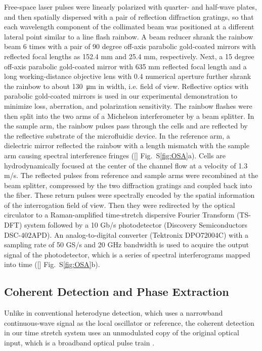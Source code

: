 \documentclass[aps,pra,reprint,longbibliography,superscriptaddress]{revtex4-1}
\begin{document}
Free-space laser pulses were linearly polarized with quarter- and half-wave plates, and then spatially dispersed with a pair of reflection diffraction gratings, so that each wavelength component of the collimated beam was positioned at a different lateral point similar to a line flash rainbow. A beam reducer shrank the rainbow beam 6 times with a pair of 90 degree off-axis parabolic gold-coated mirrors with reflected focal lengths as 152.4 mm and 25.4 mm, respectively. Next, a 15 degree off-axis parabolic gold-coated mirror with 635 mm reflected focal length and a long working-distance objective lens with 0.4 numerical aperture further shrank the rainbow to about \SI{130}{\micro\meter} in width, i.e. field of view. Reflective optics with parabolic gold-coated mirrors is used in our experimental demonstration to minimize loss, aberration, and polarization sensitivity. The rainbow flashes were then split into the two arms of a Michelson interferometer by a beam splitter. In the sample arm, the rainbow pulses pass through the cells and are reflected by the reflective substrate of the microfluidic device. In the reference arm, a dielectric mirror reflected the rainbow with a length mismatch with the sample arm causing spectral interference fringes ([] Fig.~S\ref{fig:OSA}a). Cells are hydrodynamically focused at the center of the channel flow at a velocity of 1.3 m/s. The reflected pulses from reference and sample arms were recombined at the beam splitter, compressed by the two diffraction gratings and coupled back into the fiber. These return pulses were spectrally encoded by the spatial information of the interrogation field of view. Then they were redirected by the optical circulator to a Raman-amplified time-stretch dispersive Fourier Transform (TS-DFT) system followed by a 10 Gb/s photodetector (Discovery Semiconductors DSC-402APD). An analog-to-digital converter (Tektronix DPO72004C) with a sampling rate of 50 GS/s and 20 GHz bandwidth is used to acquire the output signal of the photodetector, which is a series of spectral interferograms mapped into time ([] Fig.~S\ref{fig:OSA}b). 

\subsection{Coherent Detection and Phase Extraction}

Unlike in conventional heterodyne detection, which uses a narrowband continuous-wave signal as the local oscillator or reference, the coherent detection in our time stretch system uses an unmodulated copy of the original optical input, which is a broadband optical pulse train \cite{buckley2013coherent, devore2014coherent}. 
\end{document}
